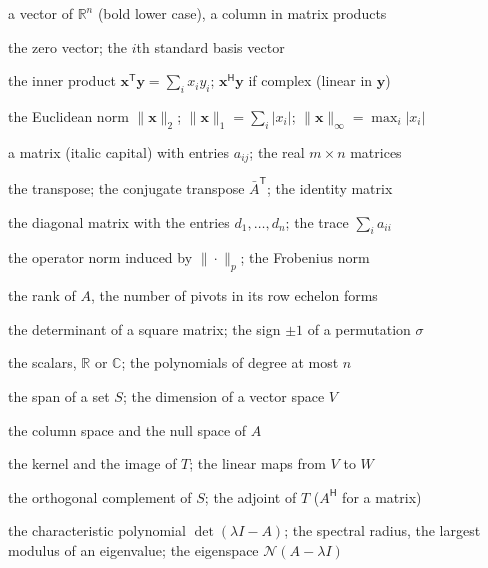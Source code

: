 \documentclass{sdbook-eng}
\begin{document}
\begin{symbols}
\item[$\mathbf x=(x_1,\ldots,x_n)$] a vector of $\mathbb R^n$ (bold lower case), a column in matrix products
\item[$\mathbf 0$, $\mathbf e_i$] the zero vector; the $i$th standard basis vector
\item[$\langle\mathbf x,\mathbf y\rangle$] the inner product $\mathbf x^{\mathsf T}\mathbf y=\sum_ix_iy_i$; $\mathbf x^{\mathsf H}\mathbf y$ if complex (linear in $\mathbf y$)
\item[$\|\mathbf x\|$, $\|\mathbf x\|_p$] the Euclidean norm $\|\mathbf x\|_2$; $\|\mathbf x\|_1=\sum_i|x_i|$; $\|\mathbf x\|_\infty=\max_i|x_i|$
\item[$A=(a_{ij})$, $\mathbb R^{m\times n}$] a matrix (italic capital) with entries $a_{ij}$; the real $m\times n$ matrices
\item[$A^{\mathsf T}$, $A^{\mathsf H}$, $I_n$] the transpose; the conjugate transpose $\bar A^{\mathsf T}$; the identity matrix
\item[$\operatorname{diag}(d_i)$, $\operatorname{tr}A$] the diagonal matrix with the entries $d_1,\ldots,d_n$; the trace $\sum_ia_{ii}$
\item[$\|A\|_p$, $\|A\|_{\mathrm F}$] the operator norm induced by $\|\cdot\|_p$; the Frobenius norm
\item[$\operatorname{rank}A$] the rank of $A$, the number of pivots in its row echelon forms
\item[$\det A$, $\operatorname{sgn}\sigma$] the determinant of a square matrix; the sign $\pm1$ of a permutation $\sigma$
\item[$\mathbb F$, $\mathcal P_n$] the scalars, $\mathbb R$ or $\mathbb C$; the polynomials of degree at most $n$
\item[$\operatorname{span}S$, $\dim V$] the span of a set $S$; the dimension of a vector space $V$
\item[$\mathcal C(A)$, $\mathcal N(A)$] the column space and the null space of $A$
\item[$\ker T$, $\operatorname{im}T$, $\mathcal L(V,W)$] the kernel and the image of $T$; the linear maps from $V$ to $W$
\item[$S^\perp$, $T^*$] the orthogonal complement of $S$; the adjoint of $T$ ($A^{\mathsf H}$ for a matrix)
\item[$p_A$, $\rho(A)$, $E_\lambda$] the characteristic polynomial $\det(\lambda I-A)$; the spectral radius, the largest modulus of an eigenvalue; the eigenspace $\mathcal N(A-\lambda I)$

\end{symbols}
\end{document}
